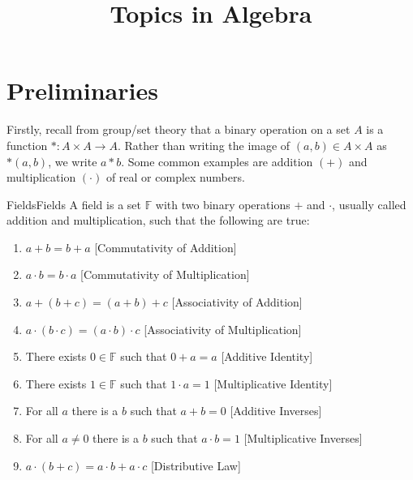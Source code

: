 \documentclass[crop=false,class=article]{standalone}                           %
\begin{document}
    \title{Topics in Algebra}
    \author{}
    \date{\vspace{-5ex}}
    \maketitle
    \section{Preliminaries}
        Firstly, recall from group/set theory that a binary operation on a
        set $A$ is a function $*:A\times{A}\rightarrow{A}$. Rather than
        writing the image of $(a,b)\in{A}\times{A}$ as $*(a,b)$, we write
        $a*b$. Some common examples are addition $(+)$ and multiplication
        $(\cdot)$ of real or complex numbers.
        \begin{fdefinition}{Fields}{Fields}
            A field is a set $\mathbb{F}$ with two binary operations $+$ and
            $\cdot$, usually called addition and multiplication, such that
            the following are true:
            \begin{enumerate}
                \item $a+b=b+a$
                      \hfill[Commutativity of Addition]
                \item $a\cdot{b}=b\cdot{a}$
                      \hfill[Commutativity of Multiplication]
                \item $a+(b+c)=(a+b)+c$
                      \hfill[Associativity of Addition]
                \item $a\cdot(b\cdot{c})=(a\cdot{b})\cdot{c}$
                      \hfill[Associativity of Multiplication]
                \item There exists $0\in\mathbb{F}$ such that $0+a=a$
                      \hfill[Additive Identity]
                \item There exists $1\in\mathbb{F}$ such that $1\cdot{a}=1$
                      \hfill[Multiplicative Identity]
                \item For all $a$ there is a $b$ such that $a+b=0$
                      \hfill[Additive Inverses]
                \item For all $a\ne{0}$ there is a $b$ such that
                      $a\cdot{b}=1$
                      \hfill[Multiplicative Inverses]
                \item $a\cdot(b+c)=a\cdot{b}+a\cdot{c}$
                      \hfill[Distributive Law]
            \end{enumerate}
        \end{fdefinition}
\end{document}
